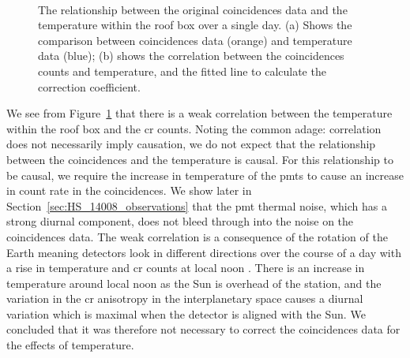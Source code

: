 \begin{figure}[ht!]
	\centering
	 \\
	
	\caption{The relationship between the original coincidences data and the temperature within the roof box over a single day. (a) Shows the comparison between coincidences data (orange) and temperature data (blue); (b) shows the correlation between the coincidences counts and temperature, and the fitted line to calculate the correction coefficient.}
	\label{fig:14008_coincidences_v_T_corr}
\end{figure}

We see from Figure~\ref{fig:14008_coincidences_v_T_corr} that there is a weak correlation between the temperature within the roof box and the \gls{cr} counts. Noting the common adage: correlation does not necessarily imply causation, we do not expect that the relationship between the coincidences and the temperature is causal. For this relationship to be causal, we require the increase in temperature of the \glspl{pmt} to cause an increase in count rate in the coincidences. We show later in Section~\ref{sec:HS_14008_observations} that the \gls{pmt} thermal noise, which has a strong diurnal component, does not bleed through into the noise on the coincidences data. The weak correlation is a consequence of the rotation of the Earth meaning detectors look in
different directions over the course of a day with a rise in temperature and \gls{cr} counts at local noon \citep{parker_theory_1964, mishra_study_2007, mishra_cosmic_2008}. There is an increase in temperature around local noon as the Sun is overhead of the station, and the variation in the \gls{cr} anisotropy in the interplanetary space causes a diurnal variation which is maximal when the detector is aligned with the Sun. We concluded that it was therefore not necessary to correct the coincidences data for the effects of temperature.


